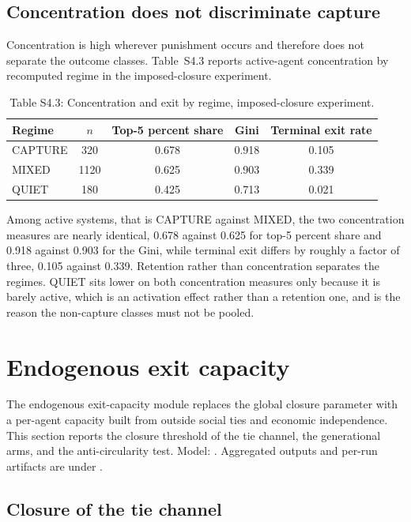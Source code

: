 \documentclass[12pt]{article}
\begin{document}
\subsection{Concentration does not discriminate capture}

Concentration is high wherever punishment occurs and therefore does not separate
the outcome classes. Table~S4.3 reports active-agent concentration by recomputed
regime in the imposed-closure experiment.

\begin{table}[htbp]
\centering
\small
\caption{Table S4.3: Concentration and exit by regime, imposed-closure experiment.}
\begin{tabular}{lcccc}
\toprule
Regime & $n$ & Top-5 percent share & Gini & Terminal exit rate \\
\midrule
CAPTURE & 320 & 0.678 & 0.918 & 0.105 \\
MIXED & 1120 & 0.625 & 0.903 & 0.339 \\
QUIET & 180 & 0.425 & 0.713 & 0.021 \\
\bottomrule
\end{tabular}
\end{table}

Among active systems, that is CAPTURE against MIXED, the two concentration
measures are nearly identical, 0.678 against 0.625 for top-5 percent share and
0.918 against 0.903 for the Gini, while terminal exit differs by roughly a factor
of three, 0.105 against 0.339. Retention rather than concentration separates the
regimes. QUIET sits lower on both concentration measures only because it is
barely active, which is an activation effect rather than a retention one, and is
the reason the non-capture classes must not be pooled.

\clearpage

\section{Endogenous exit capacity}
\label{sec:capacity}

The endogenous exit-capacity module replaces the global closure parameter with a
per-agent capacity built from outside social ties and economic independence.
This section reports the closure threshold of the tie channel, the generational
arms, and the anti-circularity test. Model:
. Aggregated outputs and per-run
artifacts are under .

\subsection{Closure of the tie channel}
\end{document}
